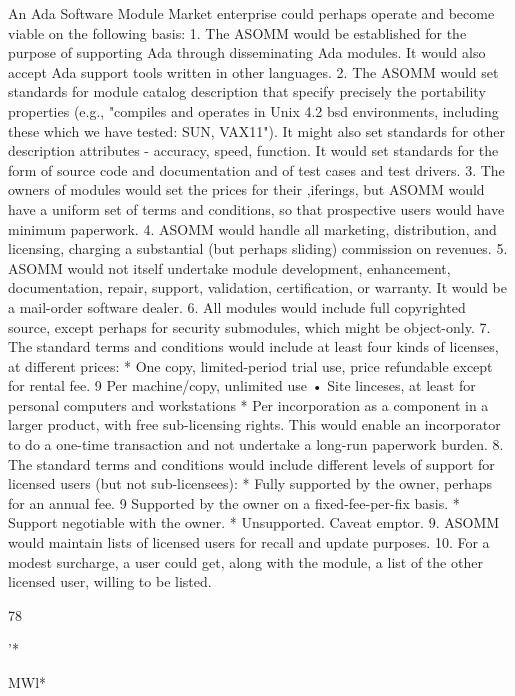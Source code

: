 \documentclass[12pt]{article}
\begin{document}
An Ada Software Module Market enterprise could perhaps operate and become viable
on the following basis:
1. The ASOMM would be established for the purpose of supporting Ada through disseminating Ada modules. It would also accept Ada support tools written in other
languages.
2. The ASOMM would set standards for module catalog description that specify precisely
the portability properties (e.g., "compiles and operates in Unix 4.2 bsd environments,
including these which we have tested: SUN, VAX11"). It might also set standards
for other description attributes - accuracy, speed, function. It would set standards
for the form of source code and documentation and of test cases and test drivers.
3. The owners of modules would set the prices for their ,iferings, but ASOMM would
have a uniform set of terms and conditions, so that prospective users would have
minimum paperwork.
4. ASOMM would handle all marketing, distribution, and licensing, charging a substantial (but perhaps sliding) commission on revenues.
5. ASOMM would not itself undertake module development, enhancement, documentation, repair, support, validation, certification, or warranty. It would be a mail-order
software dealer.
6. All modules would include full copyrighted source, except perhaps for security submodules, which might be object-only.
7. The standard terms and conditions would include at least four kinds of licenses, at
different prices:
* One copy, limited-period trial use, price refundable except for rental fee.
9 Per machine/copy, unlimited use
• Site linceses, at least for personal computers and workstations
* Per incorporation as a component in a larger product, with free sub-licensing
rights. This would enable an incorporator to do a one-time transaction and not
undertake a long-run paperwork burden.
8. The standard terms and conditions would include different levels of support for
licensed users (but not sub-licensees):
* Fully supported by the owner, perhaps for an annual fee.
9 Supported by the owner on a fixed-fee-per-fix basis.
* Support negotiable with the owner.
* Unsupported. Caveat emptor.
9. ASOMM would maintain lists of licensed users for recall and update purposes.
10. For a modest surcharge, a user could get, along with the module, a list of the other
licensed user, willing to be listed.

78

'*

MWl*

%
\end{document}
